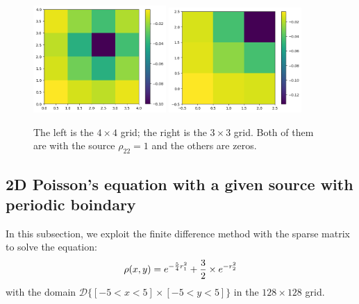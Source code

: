 \documentclass[12pt]{article}
\begin{document}
    \begin{figure}[H]
        \centering 
        \includegraphics[width = 0.45\textwidth]{./fig/1.1.png}
        \includegraphics[width = 0.45\textwidth]{./fig/1.2.png} 
        \caption{The left is the $4 \times 4$ grid; the right is the $3 \times 3$ grid. Both of them are with the source $\rho_{22} = 1$ and the others are zeros.}\label{q1}
    \end{figure}

    \subsection{2D Poisson's equation with a given source with periodic boindary}
    In this subsection, we exploit the finite difference method with the sparse matrix to solve the equation:
    \[
        \rho(x,y) = e^{-{5 \over 4} r^{2}_{1}} + {3 \over 2} \times e^{-r^{2}_{2}}
    \]
    with the domain $\mathscr{D}\big\{ [-5 < x < 5] \times [-5 < y < 5] \big\}$ in the $128 \times 128$ grid.
\end{document}
